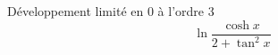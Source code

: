 D{\'e}veloppement limit{\'e} en 0 {\`a} l'ordre 3
\[\ln \frac{\cosh x}{2+\tan ^{2}x}\]
\bigskip \bigskip